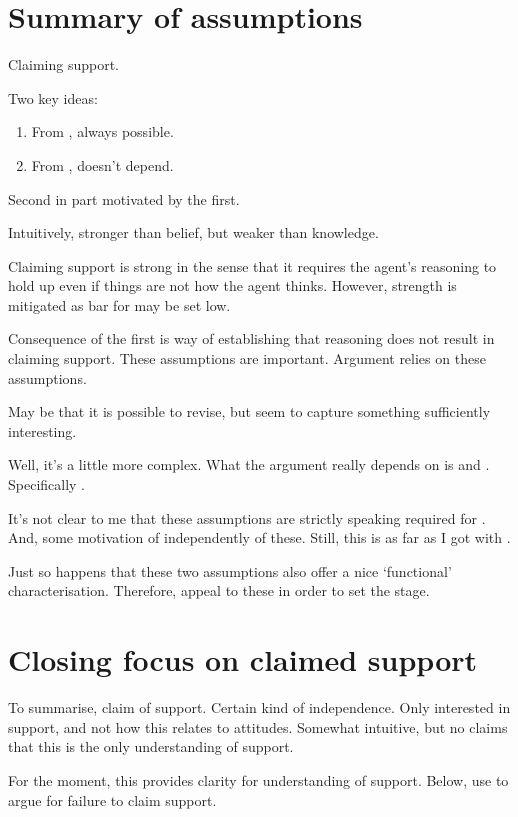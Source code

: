 \section{Summary of assumptions}

\begin{note}
  Claiming support.

  Two key ideas:

  \begin{enumerate}
  \item From \nfcs{}, always possible.
  \item From \eiS{}, doesn't depend.
  \end{enumerate}
  Second in part motivated by the first.

  Intuitively, stronger than belief, but weaker than knowledge.

  {
    \color{red}
    Claiming support is strong in the sense that it requires the agent's reasoning to hold up even if things are not how the agent thinks.
    However, strength is mitigated as bar for \expec{} may be set low.
  }

  Consequence of the first is way of establishing that reasoning does not result in claiming support.
  These assumptions are important.
  Argument relies on these assumptions.

  May be that it is possible to revise, but seem to capture something sufficiently interesting.
\end{note}

\begin{note}
  Well, it's a little more complex.
  What the argument really depends on is \ESU{} and \nI{}.
  Specifically \nI{}.

  It's not clear to me that these assumptions are strictly speaking required for \nI{}.
  And, some motivation of \nI{} independently of these.
  Still, this is as far as I got with \nI{}.

  Just so happens that these two assumptions also offer a nice `functional' characterisation.
  Therefore, appeal to these in order to set the stage.
\end{note}

\section{Closing focus on claimed support}

\begin{note}
  To summarise, claim of support.
  Certain kind of independence.
  Only interested in support, and not how this relates to attitudes.
  Somewhat intuitive, but no claims that this is the only understanding of support.

  For the moment, this provides clarity for understanding of support.
  Below, use to argue for failure to claim support.
\end{note}

